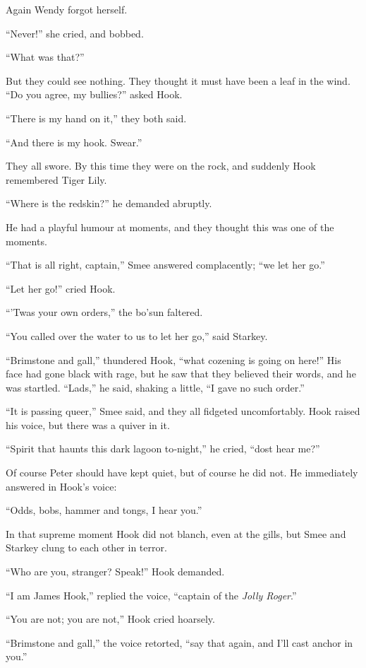Again Wendy forgot herself.

“Never!\@” she cried, and bobbed.

“What was that?”

But they could see nothing.
They thought it must have been a leaf in the wind.
“Do you agree, my bullies?\@” asked Hook.

“There is my hand on it,” they both said.

“And there is my hook.
Swear.”

They all swore.
By this time they were on the rock, and suddenly Hook remembered Tiger Lily.

“Where is the redskin?\@” he demanded abruptly.

He had a playful humour at moments, and they thought this was one of the moments.

“That is all right, captain,” Smee answered complacently;
“we let her go.”

“Let her go!\@” cried Hook.

“’Twas your own orders,” the bo’sun faltered.

“You called over the water to us to let her go,” said Starkey.

“Brimstone and gall,” thundered Hook, “what cozening is going on here!”
His face had gone black with rage, but he saw that they believed their words, and he was startled.
“Lads,” he said, shaking a little, “I gave no such order.”

“It is passing queer,” Smee said, and they all fidgeted uncomfortably.
Hook raised his voice, but there was a quiver in it.

“Spirit that haunts this dark lagoon to‐night,” he cried, “dost hear me?”

Of course Peter should have kept quiet, but of course he did not.
He immediately answered in Hook’s voice:

“Odds, bobs, hammer and tongs, I hear you.”

In that supreme moment Hook did not blanch, even at the gills,
but Smee and Starkey clung to each other in terror.

“Who are you, stranger?
Speak!\@” Hook demanded.

“I am James Hook,” replied the voice, “captain of the \emph{Jolly Roger}.”

“You are not;
you are not,” Hook cried hoarsely.

“Brimstone and gall,” the voice retorted, “say that again, and I’ll cast anchor in you.”

